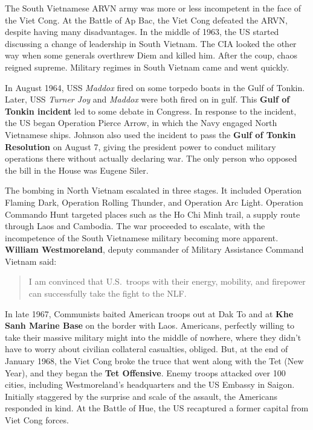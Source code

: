 The South Vietnamese ARVN army was more or less incompetent in the face of the Viet Cong.
At the Battle of Ap Bac, the Viet Cong defeated the ARVN, despite having many disadvantages.
In the middle of 1963, the US started discussing a change of leadership in South Vietnam.
The CIA looked the other way when some generals overthrew Diem and killed him.
After the coup, chaos reigned supreme.
Military regimes in South Vietnam came and went quickly.

In August 1964, USS \textit{Maddox} fired on some torpedo boats in the Gulf of Tonkin.
Later, USS \textit{Turner Joy} and \textit{Maddox} were both fired on in gulf.
This \textbf{Gulf of Tonkin incident} led to some debate in Congress.
In response to the incident,
the US began Operation Pierce Arrow, in which the Navy engaged North Vietnamese ships.
Johnson also used the incident to pass the \textbf{Gulf of Tonkin Resolution} on August 7,
giving the president power to conduct military operations there without actually declaring war.
The only person who opposed the bill in the House was Eugene Siler.

The bombing in North Vietnam escalated in three stages.
It included Operation Flaming Dark, Operation Rolling Thunder, and Operation Arc Light.
Operation Commando Hunt targeted places such as the Ho Chi Minh trail,
a supply route through Laos and Cambodia.
The war proceeded to escalate,
with the incompetence of the South Vietnamese military becoming more apparent.
\textbf{William Westmoreland}, deputy commander of Military Assistance Command Vietnam said:
\begin{quote}
  I am convinced that U.S.\ troops with their energy, mobility, and firepower
  can successfully take the fight to the NLF\@.
\end{quote}

In late 1967, Communists baited American troops out at Dak To
and at \textbf{Khe Sanh Marine Base} on the border with Laos.
Americans, perfectly willing to take their massive military might into the middle of nowhere,
where they didn't have to worry about civilian collateral casualties, obliged.
But, at the end of January 1968, the Viet Cong broke the truce that went along with the Tet (New Year),
and they began the \textbf{Tet Offensive}.
Enemy troops attacked over 100 cities,
including Westmoreland's headquarters and the US Embassy in Saigon.
Initially staggered by the surprise and scale of the assault, the Americans responded in kind.
At the Battle of Hue, the US recaptured a former capital from Viet Cong forces.


